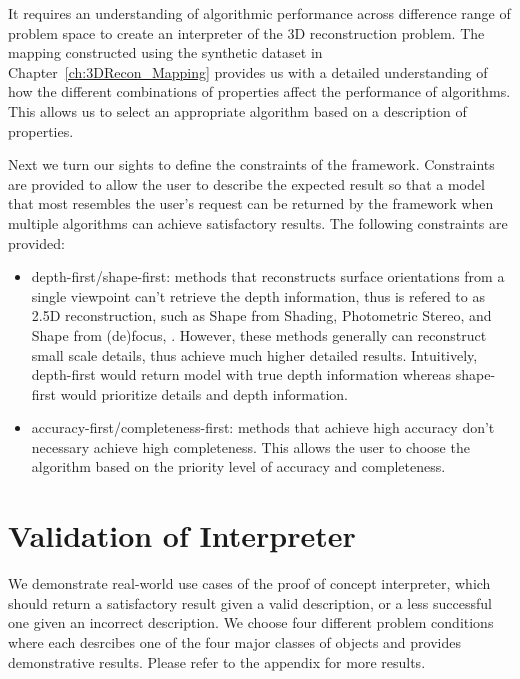 It requires an understanding of algorithmic performance across difference range of problem space to create an interpreter of the 3D reconstruction problem. The mapping constructed using the synthetic dataset in Chapter~\ref{ch:3DRecon_Mapping} provides us with a detailed understanding of how the different combinations of properties affect the performance of algorithms. This allows us to select an appropriate algorithm based on a description of properties.

Next we turn our sights to define the constraints of the framework. Constraints are provided to allow the user to describe the expected result so that a model that most resembles the user's request can be returned by the framework when multiple algorithms can achieve satisfactory results. The following constraints are provided: 
\begin{itemize}
\item depth-first/shape-first: methods that reconstructs surface orientations from a single viewpoint can't retrieve the depth information, thus is refered to as 2.5D reconstruction, such as Shape from Shading, Photometric Stereo, and Shape from (de)focus, \etc. However, these methods generally can reconstruct small scale details, thus achieve much higher detailed results. Intuitively, depth-first would return model with true depth information whereas shape-first would prioritize details and depth information.
\item accuracy-first/completeness-first: methods that achieve high accuracy don't necessary achieve high completeness. This allows the user to choose the algorithm based on the priority level of accuracy and completeness.
\end{itemize}

\section{Validation of Interpreter}
\label{sec:interp_useful}
We demonstrate real-world use cases of the proof of concept interpreter, which should return a satisfactory result given a valid description, or a less successful one given an incorrect description. We choose four different problem conditions where each desrcibes one of the four major classes of objects and provides demonstrative results. Please refer to the appendix for more results.

